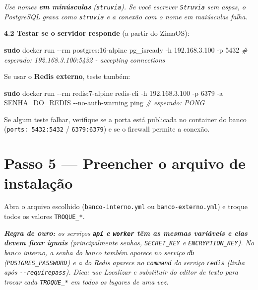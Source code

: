 \documentclass[
  10pt,
]{article}
\newenvironment{Shaded}{\begin{snugshade}}{\end{snugshade}}
\newcommand{\AttributeTok}[1]{\textcolor[rgb]{0.13,0.29,0.53}{#1}}
\newcommand{\CommentTok}[1]{\textcolor[rgb]{0.56,0.35,0.01}{\textit{#1}}}
\newcommand{\FunctionTok}[1]{\textcolor[rgb]{0.13,0.29,0.53}{\textbf{#1}}}
\newcommand{\NormalTok}[1]{#1}
\newcommand{\StringTok}[1]{\textcolor[rgb]{0.31,0.60,0.02}{#1}}
\renewenvironment{quote}{\begin{oldquote}\small\itshape}{\end{oldquote}}
\begin{document}
\begin{quote}
Use nomes \textbf{em minúsculas} (\texttt{struvia}). Se você escrever
\texttt{Struvia} sem aspas, o PostgreSQL grava como \texttt{struvia} e a
conexão com o nome em maiúsculas falha.
\end{quote}

\textbf{4.2 Testar se o servidor responde} (a partir do ZimaOS):

\begin{Shaded}
\begin{Highlighting}[]
\FunctionTok{sudo}\NormalTok{ docker run }\AttributeTok{{-}{-}rm}\NormalTok{ postgres:16{-}alpine pg\_isready }\AttributeTok{{-}h}\NormalTok{ 192.168.3.100 }\AttributeTok{{-}p}\NormalTok{ 5432}
\CommentTok{\# esperado: 192.168.3.100:5432 {-} accepting connections}
\end{Highlighting}
\end{Shaded}

Se usar o \textbf{Redis externo}, teste também:

\begin{Shaded}
\begin{Highlighting}[]
\FunctionTok{sudo}\NormalTok{ docker run }\AttributeTok{{-}{-}rm}\NormalTok{ redis:7{-}alpine redis{-}cli }\AttributeTok{{-}h}\NormalTok{ 192.168.3.100 }\AttributeTok{{-}p}\NormalTok{ 6379 }\AttributeTok{{-}a} \StringTok{\textquotesingle{}SENHA\_DO\_REDIS\textquotesingle{}} \AttributeTok{{-}{-}no{-}auth{-}warning}\NormalTok{ ping}
\CommentTok{\# esperado: PONG}
\end{Highlighting}
\end{Shaded}

Se algum teste falhar, verifique se a porta está publicada no container
do banco (\texttt{ports:\ 5432:5432} / \texttt{6379:6379}) e se o
firewall permite a conexão.

\hypertarget{passo-5-preencher-o-arquivo-de-instalauxe7uxe3o}{%
\section{Passo 5 --- Preencher o arquivo de
instalação}\label{passo-5-preencher-o-arquivo-de-instalauxe7uxe3o}}

Abra o arquivo escolhido (\texttt{banco-interno.yml} ou
\texttt{banco-externo.yml}) e troque todos os valores
\texttt{TROQUE\_*}.

\begin{quote}
\textbf{Regra de ouro:} os serviços \textbf{\texttt{api} e
\texttt{worker} têm as mesmas variáveis e elas devem ficar iguais}
(principalmente senhas, \texttt{SECRET\_KEY} e
\texttt{ENCRYPTION\_KEY}). No banco interno, a senha do banco também
aparece no serviço \texttt{db} (\texttt{POSTGRES\_PASSWORD}) e a do
Redis aparece no \texttt{command} do serviço \texttt{redis} (linha após
\texttt{-\/-requirepass}). Dica: use \emph{Localizar e substituir} do
editor de texto para trocar cada \texttt{TROQUE\_*} em todos os lugares
de uma vez.
\end{quote}
\end{document}

